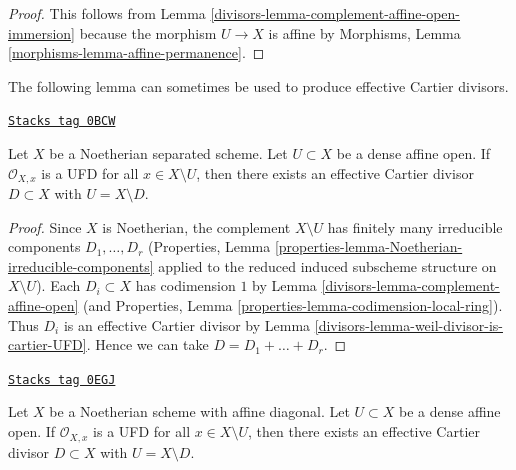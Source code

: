 \begin{proof}

This follows from Lemma \ref{divisors-lemma-complement-affine-open-immersion}
because the morphism $U \to X$ is affine by
Morphisms, Lemma \ref{morphisms-lemma-affine-permanence}.
\end{proof}

The following lemma can sometimes be used to produce effective
Cartier divisors.

\begin{lemma}
\label{divisors-lemma-complement-open-affine-effective-cartier-divisor}
\href{https://stacks.math.columbia.edu/tag/0BCW}{\texttt{Stacks tag 0BCW}}

Let $X$ be a Noetherian separated scheme. Let $U \subset X$ be
a dense affine open. If $\mathcal{O}_{X, x}$ is a UFD for all
$x \in X \setminus U$, then there exists an effective Cartier
divisor $D \subset X$ with $U = X \setminus D$.
\end{lemma}

\begin{proof}

Since $X$ is Noetherian, the complement $X \setminus U$ has finitely
many irreducible components $D_1, \ldots, D_r$
(Properties, Lemma \ref{properties-lemma-Noetherian-irreducible-components}
applied to the reduced induced subscheme structure on $X \setminus U$).
Each $D_i \subset X$ has codimension $1$ by
Lemma \ref{divisors-lemma-complement-affine-open}
(and Properties, Lemma \ref{properties-lemma-codimension-local-ring}).
Thus $D_i$ is an effective Cartier divisor by
Lemma \ref{divisors-lemma-weil-divisor-is-cartier-UFD}.
Hence we can take $D = D_1 + \ldots + D_r$.
\end{proof}

\begin{lemma}
\label{divisors-lemma-complement-open-affine-effective-cartier-divisor-bis}
\href{https://stacks.math.columbia.edu/tag/0EGJ}{\texttt{Stacks tag 0EGJ}}

Let $X$ be a Noetherian scheme with affine diagonal. Let $U \subset X$ be
a dense affine open. If $\mathcal{O}_{X, x}$ is a UFD for all
$x \in X \setminus U$, then there exists an effective Cartier
divisor $D \subset X$ with $U = X \setminus D$.
\end{lemma}

